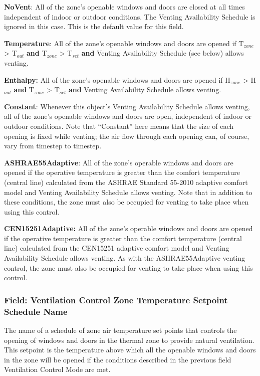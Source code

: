 \textbf{NoVent}: All of the zone's openable windows and doors are closed at all times independent of indoor or outdoor conditions. The Venting Availability Schedule is ignored in this case. This is the default value for this field.

\textbf{Temperature}: All of the zone's openable windows and doors are opened if T\(_{zone}\) \textgreater{} T\(_{out}\) \textbf{and} T\(_{zone}\) \textgreater{} T\(_{set}\) \textbf{and} Venting Availability Schedule (see below) allows venting.

\textbf{Enthalpy:} All of the zone's openable windows and doors are opened if H\(_{zone}\) \textgreater{} H\(_{out}\) \textbf{and} T\(_{zone}\) \textgreater{} T\(_{set}\) \textbf{and} Venting Availability Schedule allows venting.

\textbf{Constant}: Whenever this object's Venting Availability Schedule allows venting, all of the zone's openable windows and doors are open, independent of indoor or outdoor conditions. Note that ``Constant'' here means that the size of each opening is fixed while venting; the air flow through each opening can, of course, vary from timestep to timestep.

\textbf{ASHRAE55Adaptive}: All of the zone's operable windows and doors are opened if the operative temperature is greater than the comfort temperature (central line) calculated from the ASHRAE Standard 55-2010 adaptive comfort model and Venting Availability Schedule allows venting. Note that in addition to these conditions, the zone must also be occupied for venting to take place when using this control.

\textbf{CEN15251Adaptive:} All of the zone's operable windows and doors are opened if the operative temperature is greater than the comfort temperature (central line) calculated from the CEN15251 adaptive comfort model and Venting Availability Schedule allows venting. As with the ASHRAE55Adaptive venting control, the zone must also be occupied for venting to take place when using this control.

\subsubsection{Field: Ventilation Control Zone Temperature Setpoint Schedule Name}\label{field-ventilation-control-zone-temperature-setpoint-schedule-name}

The name of a schedule of zone air temperature set points that controls the opening of windows and doors in the thermal zone to provide natural ventilation. This setpoint is the temperature above which all the openable windows and doors in the zone will be opened if the conditions described in the previous field Ventilation Control Mode are met.

